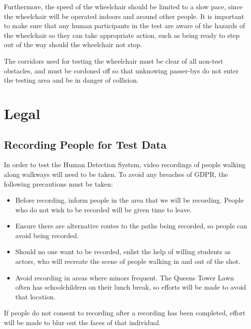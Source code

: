\documentclass[12pt,a4paper]{report}
\begin{document}
Furthermore, the speed of the wheelchair should be limited to a slow pace, since the wheelchair will be operated indoors and around other people. It is important to make sure that any human participants in the test are aware of the hazards of the wheelchair so they can take appropriate action, such as being ready to step out of the way should the wheelchair not stop.

The corridors used for testing the wheelchair must be clear of all non-test obstacles, and must be cordoned off so that unknowing passer-bys do not enter the testing area and be in danger of collision.

\section{Legal}

\subsection{Recording People for Test Data}
In order to test the Human Detection System, video recordings of people walking along walkways will need to be taken. To avoid any breaches of GDPR, the following precautions must be taken:

\begin{itemize}
	\item Before recording, inform people in the area that we will be recording. People who do not wish to be recorded will be given time to leave.
	\item Ensure there are alternative routes to the paths being recorded, so people can avoid being recorded.
	\item Should no one want to be recorded, enlist the help of willing students as actors, who will recreate the scene of people walking in and out of the shot.
	\item Avoid recording in areas where minors frequent. The Queens Tower Lawn often has schoolchildren on their lunch break, so efforts will be made to avoid that location.
\end{itemize}

If people do not consent to recording after a recording has been completed, effort will be made to blur out the faces of that individual.



\newpage



\newpage

\appendix
\pagestyle{fancy}
\fancyhf{}
\end{document}
